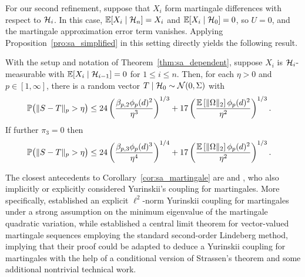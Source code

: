 For our second refinement, suppose that
$X_i$ form martingale differences with respect to $\mathcal{H}_i$.
In this case, $\mathbb{E}[X_i \mid \mathcal{H}_n] = X_i$ and $\mathbb{E}[X_i \mid \mathcal{H}_0] = 0$,
so $U = 0$, and the martingale approximation error term vanishes.
Applying Proposition~\ref{pro:sa_simplified} in this setting
directly yields the following result.
%
\begin{corollary}%
  \label{cor:sa_martingale}

  With the setup and notation of Theorem~\ref{thm:sa_dependent}, suppose $X_i$
  is $\mathcal{H}_i$-measurable with $\mathbb{E}[X_i \mid \mathcal{H}_{i-1}] = 0$ for
  $1 \leq i \leq n$. Then, for each $\eta > 0$ and $p \in [1,\infty]$, there is
  a random vector $T \mid \mathcal{H}_0 \sim \mathcal{N}(0, \Sigma)$ with
  \begin{align}
    \label{eq:sa_martingale_order_2}
    \mathbb{P}\big(\|S-T\|_p > \eta\big)
    &\leq
    24 \left(
      \frac{\beta_{p,2} \phi_p(d)^2}{\eta^3}
    \right)^{1/3}
    + 17 \left(
      \frac{\mathbb{E} \left[ \|\Omega\|_2 \right] \phi_p(d)^2}{\eta^2}
    \right)^{1/3}.
  \end{align}
  If further $\pi_3 = 0$ then
  \begin{align}
    \label{eq:sa_martingale_order_3}
    \mathbb{P}\big(\|S-T\|_p > \eta\big)
    &\leq
    24 \left(
      \frac{\beta_{p,3} \phi_p(d)^3}{\eta^4}
    \right)^{1/4}
    + 17 \left(
      \frac{\mathbb{E} \left[ \|\Omega\|_2 \right] \phi_p(d)^2}{\eta^2}
    \right)^{1/3}.
  \end{align}
\end{corollary}

The closest antecedents to Corollary~\ref{cor:sa_martingale} are
\citet{belloni2018high} and \citet{li2020uniform}, who also implicitly or
explicitly considered Yurinskii's coupling for martingales. More specifically,
\citet[Theorem~1]{li2020uniform} established an explicit
$\ell^2$-norm Yurinskii coupling
for martingales under a strong assumption on the minimum eigenvalue of the
martingale quadratic variation, while \citet[Theorem~2.1]{belloni2018high}
established a
central limit theorem for vector-valued martingale sequences employing the
standard second-order Lindeberg method, implying that their proof could be
adapted to deduce a Yurinskii coupling for martingales with the help of a
conditional version of Strassen's theorem \citep{chen2020jackknife} and some
additional nontrivial technical work.

